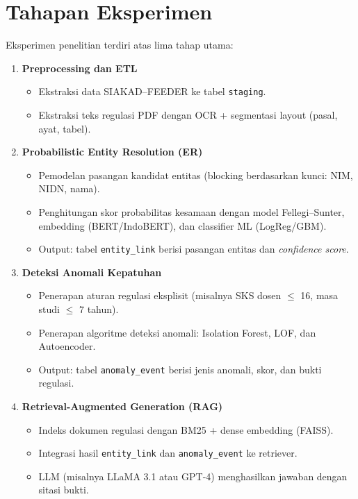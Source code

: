\documentclass[12pt,a4paper,oneside]{report}
\begin{document}
        \section{Tahapan Eksperimen}
        Eksperimen penelitian terdiri atas lima tahap utama:
        \begin{enumerate}
            \item \textbf{Preprocessing dan ETL}
            \begin{itemize}
                \item Ekstraksi data SIAKAD–FEEDER ke tabel \texttt{staging}.
                \item Ekstraksi teks regulasi PDF dengan OCR + segmentasi layout (pasal, ayat, tabel).
            \end{itemize}

            \item \textbf{Probabilistic Entity Resolution (ER)}
            \begin{itemize}
                \item Pemodelan pasangan kandidat entitas (blocking berdasarkan kunci: NIM, NIDN, nama).
                \item Penghitungan skor probabilitas kesamaan dengan model Fellegi–Sunter, embedding (BERT/IndoBERT), dan classifier ML (LogReg/GBM).
                \item Output: tabel \texttt{entity\_link} berisi pasangan entitas dan \textit{confidence score}.
            \end{itemize}

            \item \textbf{Deteksi Anomali Kepatuhan}
            \begin{itemize}
                \item Penerapan aturan regulasi eksplisit (misalnya SKS dosen $\leq$ 16, masa studi $\leq$ 7 tahun).
                \item Penerapan algoritme deteksi anomali: Isolation Forest, LOF, dan Autoencoder.
                \item Output: tabel \texttt{anomaly\_event} berisi jenis anomali, skor, dan bukti regulasi.
            \end{itemize}

            \item \textbf{Retrieval-Augmented Generation (RAG)}
            \begin{itemize}
                \item Indeks dokumen regulasi dengan BM25 + dense embedding (FAISS).
                \item Integrasi hasil \texttt{entity\_link} dan \texttt{anomaly\_event} ke retriever.
                \item LLM (misalnya LLaMA 3.1 atau GPT-4) menghasilkan jawaban dengan sitasi bukti.
            \end{itemize}


\end{enumerate}
\end{document}
